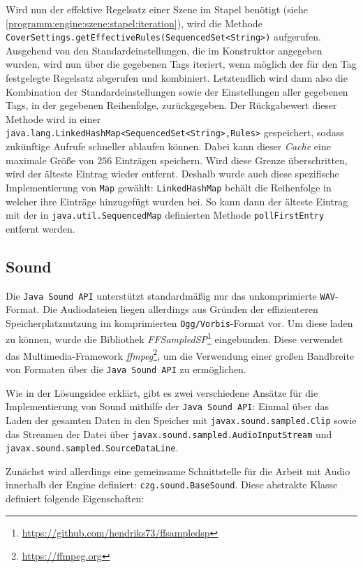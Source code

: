 \begin{sloppypar}
Wird nun der effektive Regelsatz einer Szene im Stapel benötigt (siehe \ref{programm:engine:szene:stapel:iteration}), wird die Methode
\texttt{CoverSettings.getEffectiveRules(SequencedSet<String>)} aufgerufen.
Ausgehend von den Standardeinstellungen, die im Konstruktor angegeben wurden,
wird nun über die gegebenen Tags iteriert, wenn möglich der für den Tag
festgelegte Regelsatz abgerufen und kombiniert. Letztendlich wird dann also
die Kombination der Standardeinstellungen sowie der Einstellungen aller
gegebenen Tags, in der gegebenen Reihenfolge, zurückgegeben. Der Rückgabewert
dieser Methode wird in einer \texttt{java.lang.LinkedHashMap<SequencedSet<String>,Rules>}
gespeichert, sodass zukünftige Aufrufe schneller ablaufen können. Dabei kann
dieser \textit{Cache} eine maximale Größe von $256$ Einträgen speichern. Wird
diese Grenze überschritten, wird der älteste Eintrag wieder entfernt. Deshalb
wurde auch diese spezifische Implementierung von \texttt{Map} gewählt:
\texttt{LinkedHashMap} behält die Reihenfolge in welcher ihre Einträge hinzugefügt
wurden bei. So kann dann der älteste Eintrag mit der in \texttt{java.util.SequencedMap}
definierten Methode \texttt{pollFirstEntry} entfernt werden.



\subsection{Sound}

Die \texttt{Java Sound API} unterstützt standardmäßig nur das unkomprimierte
\texttt{WAV}-Format. Die Audiodateien liegen allerdings  aus Gründen der
effizienteren Speicherplatznutzung im komprimierten \texttt{Ogg/Vorbis}-Format
vor. Um diese laden zu können, wurde die Bibliothek \textit{FFSampledSP}\footnote{\url{https://github.com/hendriks73/ffsampledsp}}
eingebunden. Diese verwendet das Multimedia-Framework \textit{ffmpeg}\footnote{\url{https://ffmpeg.org}},
um die Verwendung einer großen Bandbreite von Formaten über die \texttt{Java Sound API}
zu ermöglichen.

Wie in der Lösungsidee erklärt, gibt es zwei verschiedene Ansätze für
die Implementierung von Sound mithilfe der \texttt{Java Sound API}:
Einmal über das Laden der gesamten Daten in den Speicher mit
\texttt{javax.sound.sampled.Clip} sowie das Streamen der Datei
über \texttt{javax.sound.sampled.AudioInputStream} und
\texttt{javax.sound.sampled.SourceDataLine}.

Zunächst wird allerdings eine gemeinsame Schnittstelle für die
Arbeit mit Audio innerhalb der Engine definiert: \texttt{czg.sound.BaseSound}.
Diese abstrakte Klasse definiert folgende Eigenschaften:


\end{sloppypar}
